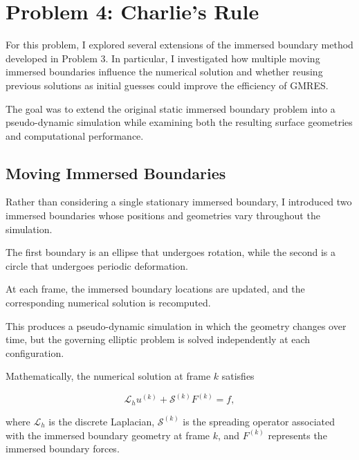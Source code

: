 \documentclass[11pt]{article}
\begin{document}

\section*{Problem 4: Charlie's Rule}

For this problem, I explored several extensions of the immersed
boundary method developed in Problem 3. In particular, I investigated
how multiple moving immersed boundaries influence the numerical
solution and whether reusing previous solutions as initial guesses
could improve the efficiency of GMRES.

The goal was to extend the original static immersed boundary
problem into a pseudo-dynamic simulation while examining both
the resulting surface geometries and computational performance.


\subsection*{Moving Immersed Boundaries}

Rather than considering a single stationary immersed boundary,
I introduced two immersed boundaries whose positions and geometries
vary throughout the simulation.

The first boundary is an ellipse that undergoes rotation,
while the second is a circle that undergoes periodic deformation.

At each frame, the immersed boundary locations are updated,
and the corresponding numerical solution is recomputed.

This produces a pseudo-dynamic simulation in which the geometry
changes over time, but the governing elliptic problem is solved
independently at each configuration.

Mathematically, the numerical solution at frame $k$ satisfies

\begin{equation}
    \mathcal{L}_h u^{(k)}
    +
    \mathcal{S}^{(k)} F^{(k)}
    =
    f,
\end{equation}

where $\mathcal{L}_h$ is the discrete Laplacian,
$\mathcal{S}^{(k)}$ is the spreading operator associated
with the immersed boundary geometry at frame $k$, and
$F^{(k)}$ represents the immersed boundary forces.
\end{document}
